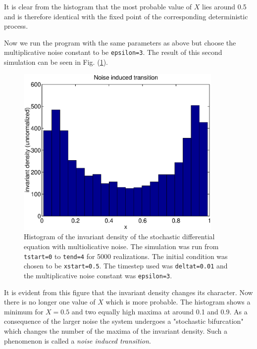 It is clear from the histogram that the most probable value of $X$ 
lies around 0.5 and is therefore identical with the fixed point of 
the corresponding deterministic process.

Now we run the program with the same parameters as above but 
choose the multiplicative noise constant to be \texttt{epsilon=3}.
The result of this second simulation can be seen in Fig. 
(\ref{F_SDENOISEIN_2}).
\begin{figure}
\label{F_SDENOISEIN_2}
\includegraphics[width=10cm]{../Figures/f_sdenoisein_2.eps}
\caption{Histogram of the invariant density of the stochastic differential 
equation with multiolicative noise. The simulation was run from
\texttt{tstart=0} to \texttt{tend=4} for 5000 realizations.
The initial condition was chosen to be \texttt{xstart=0.5}.
The timestep used was \texttt{deltat=0.01} and the multiplicative noise 
constant was \texttt{epsilon=3}.} 
\end{figure}
It is evident from this figure that the invariant density changes 
its character. Now there is no longer one value of $X$ which is 
more probable. The histogram shows a minimum for $X=0.5$ and two 
equally high maxima at around 0.1 and 0.9. As a consequence of 
the larger noise the system undergoes a "stochastic bifurcation" 
which changes the number of the maxima of the invariant density. 
Such a phenomenon is called a {\em noise induced transition}.

